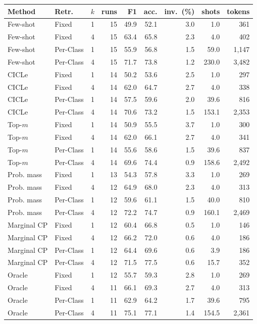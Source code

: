\begin{tabular}{llrrrrrrr}
\toprule
Method & Retr. & $k$ & runs & F1 & acc. & inv.\ (\%) & shots & tokens \\
\midrule
Few-shot & Fixed & 1 & 15 & 49.9 & 52.1 & 3.0 & 1.0 & 361 \\
Few-shot & Fixed & 4 & 15 & 63.4 & 65.8 & 2.3 & 4.0 & 402 \\
Few-shot & Per-Class & 1 & 15 & 55.9 & 56.8 & 1.5 & 59.0 & 1,147 \\
Few-shot & Per-Class & 4 & 15 & 71.7 & 73.8 & 1.2 & 230.0 & 3,482 \\
CICLe & Fixed & 1 & 14 & 50.2 & 53.6 & 2.5 & 1.0 & 297 \\
CICLe & Fixed & 4 & 14 & 62.0 & 64.7 & 2.7 & 4.0 & 338 \\
CICLe & Per-Class & 1 & 14 & 57.5 & 59.6 & 2.0 & 39.6 & 816 \\
CICLe & Per-Class & 4 & 14 & 70.6 & 73.2 & 1.5 & 153.1 & 2,353 \\
\midrule
Top-$m$ & Fixed & 1 & 14 & 50.9 & 55.5 & 3.7 & 1.0 & 300 \\
Top-$m$ & Fixed & 4 & 14 & 62.0 & 66.1 & 2.7 & 4.0 & 341 \\
Top-$m$ & Per-Class & 1 & 14 & 55.6 & 58.6 & 1.5 & 39.6 & 837 \\
Top-$m$ & Per-Class & 4 & 14 & 69.6 & 74.4 & 0.9 & 158.6 & 2,492 \\
Prob. mass & Fixed & 1 & 13 & 54.3 & 57.8 & 3.3 & 1.0 & 269 \\
Prob. mass & Fixed & 4 & 12 & 64.9 & 68.0 & 2.3 & 4.0 & 313 \\
Prob. mass & Per-Class & 1 & 12 & 59.6 & 61.1 & 1.5 & 40.0 & 810 \\
Prob. mass & Per-Class & 4 & 12 & 72.2 & 74.7 & 0.9 & 160.1 & 2,469 \\
Marginal CP & Fixed & 1 & 12 & 60.4 & 66.8 & 0.5 & 1.0 & 146 \\
Marginal CP & Fixed & 4 & 12 & 66.2 & 72.0 & 0.6 & 4.0 & 186 \\
Marginal CP & Per-Class & 1 & 12 & 64.4 & 69.6 & 0.6 & 3.9 & 186 \\
Marginal CP & Per-Class & 4 & 12 & 71.5 & 77.5 & 0.6 & 15.7 & 352 \\
Oracle & Fixed & 1 & 12 & 55.7 & 59.3 & 2.8 & 1.0 & 269 \\
Oracle & Fixed & 4 & 11 & 66.1 & 69.3 & 2.7 & 4.0 & 313 \\
Oracle & Per-Class & 1 & 11 & 62.9 & 64.2 & 1.7 & 39.6 & 795 \\
Oracle & Per-Class & 4 & 11 & 75.1 & 77.1 & 1.4 & 154.5 & 2,361 \\
\bottomrule
\end{tabular}
